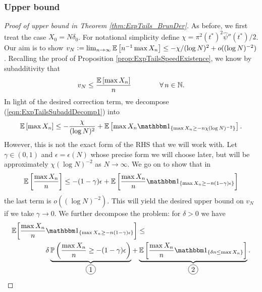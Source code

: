 \subsubsection{Upper bound}
\begin{proof}[Proof of upper bound in Theorem \ref{thm:ExpTails_BrunDer}]
As before, we first treat the case $X_0 = N \delta_0$. For notational simplicity define $\chi = \pi^2 (t^*)^2 \widehat{\psi}''(t^*) / 2$. Our aim is to show $v_N \vcentcolon= \lim_{n \to \infty} \mathbb{E}\left[ n^{-1} \max X_n \right] \leq -  \chi / (\log N)^2 + o((\log N)^{-2})$. Recalling the proof of Proposition \ref{prop:ExpTailsSpeedExistence}, we know by subadditivity that
\begin{equation}\label{eqn:ExpTailsSubaddDecomp1}
v_N \leq \frac{\mathbb{E}\left[ \max X_n \right]}{n} \qquad\qquad\forall\, n \in \mathbb{N}. 
\end{equation}
In light of the desired correction term, we decompose (\ref{eqn:ExpTailsSubaddDecomp1}) into
\begin{equation}\nonumber
\Ex{\max X_n} \leq - \frac{\chi}{(\log N)^2} + \Ex{\max X_n \Ind_{\{\max X_n \geq -n \chi (\log N)^{-2} \}}}. 
\end{equation}
However, this is not the exact form of the RHS that we will work with. Let $\gamma \in (0,1)$ and $\epsilon = \epsilon(N)$ whose precise form we will choose later, but will be approximately $\chi (\log N)^{-2}$ as $N \to \infty$. We go on to show that in
\begin{equation}\nonumber
\Ex{\frac{\max X_n}{n}} \leq  - (1 - \gamma)\epsilon + \Ex{\frac{\max X_n}{n} \Ind_{\{\max X_n \geq  -n (1 - \gamma) \epsilon \}}}
\end{equation}
the last term is $o((\log N)^{-2})$. This will yield the desired upper bound on $v_N$ if we take $\gamma \to 0$. We further decompose the problem: for $\delta > 0$ we have
\begin{align*} 
\E \bigg[\frac{\max X_n}{n} &\Ind_{\{\max X_n \geq - n (1 - \gamma)\epsilon \}}\bigg] \leq \\
							&\delta\underbrace{\Pr{\frac{\max X_n}{n} \geq -(1 - \gamma)\epsilon }}_{\circled{1}} + \underbrace{\Ex{\frac{\max X_n}{n} \Ind_{\{ \delta n \leq \max X_n \}}}}_{\circled{2}}. 
\end{align*}

\end{proof}
